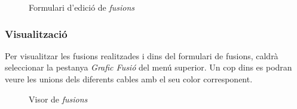 \documentclass[a4paper]{article}
\begin{document}
	\begin{figure}[H]
		\centering
		\caption{Formulari d'edició de \emph{fusions}}
	\end{figure}

	\subsubsection{Visualització}
	Per visualitzar les fusions realitzades i dins del formulari de fusions, caldrà seleccionar la pestanya \emph{Grafic Fusió} del menú superior. Un cop dins es podran veure les unions dels diferents cables amb el seu color corresponent.
	
	\begin{figure}[H]
		\centering
		\caption{Visor de \emph{fusions}}
	\end{figure}
\end{document}
